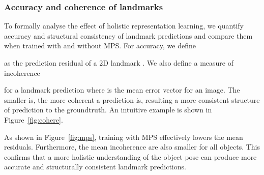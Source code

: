 \documentclass[10pt,twocolumn,letterpaper]{article}
\begin{document}
\subsubsection{Accuracy and coherence of landmarks}



To formally analyse the effect of holistic representation learning, we quantify accuracy and structural consistency of landmark predictions and compare them when trained with and without MPS. For accuracy, we define 

as the prediction residual of a 2D landmark . We also define a measure of incoherence 

for a landmark prediction  where  is the mean error vector for an image. The smaller  is, the more coherent a prediction  is, resulting a more consistent structure of prediction to the groundtruth. An intuitive example is shown in Figure~\ref{fig:cohere}.




As shown in Figure~\ref{fig:mps}, training with MPS effectively lowers the mean residuals. Furthermore, the mean incoherence are also smaller for all objects. This confirms that a more holistic understanding of the object pose can produce more accurate and structurally consistent landmark predictions. 
\end{document}
